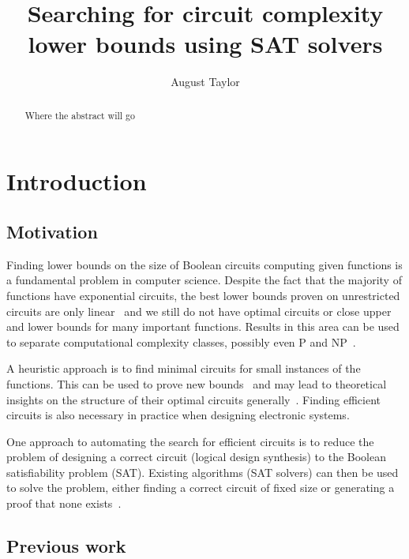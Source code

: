 \documentclass{article}
\begin{document}
\begin{titlepage}
\title{Searching for circuit complexity lower bounds using SAT solvers}
\author{August Taylor}
\maketitle
\end{titlepage}

\begin{abstract}
Where the abstract will go
\end{abstract}

\tableofcontents

\section{Introduction}

\subsection{Motivation}

Finding lower bounds on the size of Boolean circuits computing given functions is a fundamental problem in computer science. Despite the fact that the majority of functions have exponential circuits, the best lower bounds proven on unrestricted circuits are only linear~\cite{boppana} and we still do not have optimal circuits or close upper and lower bounds for many important functions. Results in this area can be used to separate computational complexity classes, possibly even P and NP~\cite{arora}.

A heuristic approach is to find minimal circuits for small instances of the functions. This can be used to prove new bounds~\cite{kulikovsurvey} and may lead to theoretical insights on the structure of their optimal circuits generally~\cite{williams}. Finding efficient circuits is also necessary in practice when designing electronic systems. 

One approach to automating the search for efficient circuits is to reduce the problem of designing a correct circuit (logical design synthesis) to the Boolean satisfiability problem (SAT). Existing algorithms (SAT solvers) can then be used to solve the problem, either finding a correct circuit of fixed size or generating a proof that none exists~\cite{kulikov}.

\subsection{Previous work}
\end{document}
